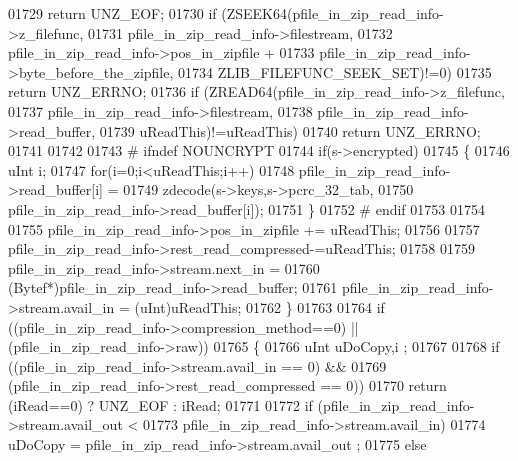 \begin{DoxyCode}
01729                 \textcolor{keywordflow}{return} UNZ\_EOF;
01730             \textcolor{keywordflow}{if} (ZSEEK64(pfile\_in\_zip\_read\_info->z\_filefunc,
01731                       pfile\_in\_zip\_read\_info->filestream,
01732                       pfile\_in\_zip\_read\_info->pos\_in\_zipfile +
01733                          pfile\_in\_zip\_read\_info->byte\_before\_the\_zipfile,
01734                          ZLIB\_FILEFUNC\_SEEK\_SET)!=0)
01735                 \textcolor{keywordflow}{return} UNZ\_ERRNO;
01736             \textcolor{keywordflow}{if} (ZREAD64(pfile\_in\_zip\_read\_info->z\_filefunc,
01737                       pfile\_in\_zip\_read\_info->filestream,
01738                       pfile\_in\_zip\_read\_info->read\_buffer,
01739                       uReadThis)!=uReadThis)
01740                 \textcolor{keywordflow}{return} UNZ\_ERRNO;
01741 
01742 
01743 \textcolor{preprocessor}{#            ifndef NOUNCRYPT}
01744             \textcolor{keywordflow}{if}(s->encrypted)
01745             \{
01746                 uInt i;
01747                 \textcolor{keywordflow}{for}(i=0;i<uReadThis;i++)
01748                   pfile\_in\_zip\_read\_info->read\_buffer[i] =
01749                       zdecode(s->keys,s->pcrc\_32\_tab,
01750                               pfile\_in\_zip\_read\_info->read\_buffer[i]);
01751             \}
01752 \textcolor{preprocessor}{#            endif}
01753 
01754 
01755             pfile\_in\_zip\_read\_info->pos\_in\_zipfile += uReadThis;
01756 
01757             pfile\_in\_zip\_read\_info->rest\_read\_compressed-=uReadThis;
01758 
01759             pfile\_in\_zip\_read\_info->stream.next\_in =
01760                 (Bytef*)pfile\_in\_zip\_read\_info->read\_buffer;
01761             pfile\_in\_zip\_read\_info->stream.avail\_in = (uInt)uReadThis;
01762         \}
01763 
01764         \textcolor{keywordflow}{if} ((pfile\_in\_zip\_read\_info->compression\_method==0) || (pfile\_in\_zip\_read\_info->raw))
01765         \{
01766             uInt uDoCopy,i ;
01767 
01768             \textcolor{keywordflow}{if} ((pfile\_in\_zip\_read\_info->stream.avail\_in == 0) &&
01769                 (pfile\_in\_zip\_read\_info->rest\_read\_compressed == 0))
01770                 \textcolor{keywordflow}{return} (iRead==0) ? UNZ\_EOF : iRead;
01771 
01772             \textcolor{keywordflow}{if} (pfile\_in\_zip\_read\_info->stream.avail\_out <
01773                             pfile\_in\_zip\_read\_info->stream.avail\_in)
01774                 uDoCopy = pfile\_in\_zip\_read\_info->stream.avail\_out ;
01775             \textcolor{keywordflow}{else}

\end{DoxyCode}
